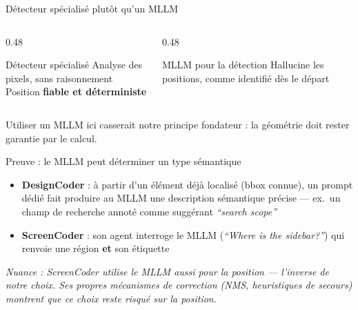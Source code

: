 \documentclass[11pt,aspectratio=169]{beamer}
\begin{document}
\begin{frame}{Détecteur spécialisé plutôt qu'un MLLM}
  \begin{columns}[T,onlytextwidth]
    \begin{column}{0.48\textwidth}
      \begin{block}{Détecteur spécialisé}
        Analyse des pixels, sans raisonnement \\[2pt]
        Position \textbf{fiable et déterministe}
      \end{block}
    \end{column}
    \begin{column}{0.48\textwidth}
      \begin{alertblock}{MLLM pour la détection}
        \alert{Hallucine les positions}, comme identifié dès le départ
      \end{alertblock}
    \end{column}
  \end{columns}
  \vspace{8mm}
  \begin{center}
  \small Utiliser un MLLM ici casserait notre principe fondateur : la géométrie doit rester garantie par le calcul.
  \end{center}
\end{frame}

\begin{frame}{Preuve : le MLLM peut déterminer un type sémantique}
  \begin{itemize}
    \item \textbf{DesignCoder} \cite{designcoder} : à partir d'un élément déjà localisé (bbox connue), un prompt dédié fait produire au MLLM une description sémantique précise --- ex.\ un champ de recherche annoté comme suggérant \textit{``search scope''}
    \item \textbf{ScreenCoder} \cite{screencoder} : son agent interroge le MLLM (\textit{``Where is the sidebar?''}) qui renvoie une région \textbf{et} son étiquette
  \end{itemize}
  \vspace{4mm}
  \small \textit{Nuance : ScreenCoder utilise le MLLM aussi pour la position --- l'inverse de notre choix. Ses propres mécanismes de correction (NMS, heuristiques de secours) montrent que ce choix reste risqué sur la position.}
\end{frame}
\end{document}
